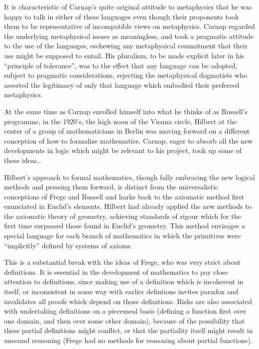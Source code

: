 It is characteristic of Carnap's quite original attitude to
metaphysics that he was happy to talk in either of these languages
even though their proponents took them to be representative of
incompatible views on metaphysics.
Carnap regarded the underlying metaphysical issues as meaningless, and
took a pragmatic attitude to the use of the languages, eschewing any
metaphysical commitment that their use might be supposed to entail.
His pluralism, to be made explicit later in his ``principle of
tolerance'', was to the effect that any language can be adopted,
subject to pragmatic considerations, rejecting the metaphysical
dogmatists who asserted the legitimacy of only that language which
embodied their preferred metaphysics.

At the same time as Carnap enrolled himself into what he thinks of as
Russell's programme, in the 1920's, the high noon of the Vienna
circle, Hilbert at the center of a group of mathematicians in Berlin
was moving forward on a different conception of how to formalize
mathematics.
Carnap, eager to absorb all the new developments in
logic which might be relevant to his project, took up some of these ideas..

Hilbert's approach to formal mathematics, though fully embracing the
new logical methods and pressing them forward, is distinct from the
universalistic conceptions of Frege and Russell and harks back to the
axiomatic method first enunciated in Euclid's elements.
Hilbert had already applied the new methods to the axiomatic theory of
geometry, achieving standards of rigour which for the first time
surpassed those found in Euclid's geometry.
This method envisages a special language for each branch of
mathematics in which the primitives were ``implicitly'' defined by
systems of axioms.

This is a substantial break with the ideas of Frege, who was very
strict about definitions.
It is essential in the development of mathematics to pay close
attention to definitions, since making use of a definition which is
incoherent in itself, or inconsistent in some way with earlier defintions
invites paradox and invalidates all proofs which depend on those definitions.
Risks are also associated with undertaking definitions on a piecemeal
basis (defining a function first over one domain, and then over some
other domain), because of the possibility that these partial
definitions might conflict, or that the partiality itself might result
in unsound reasoning (Frege had no methods for reasoning about partial functions).

